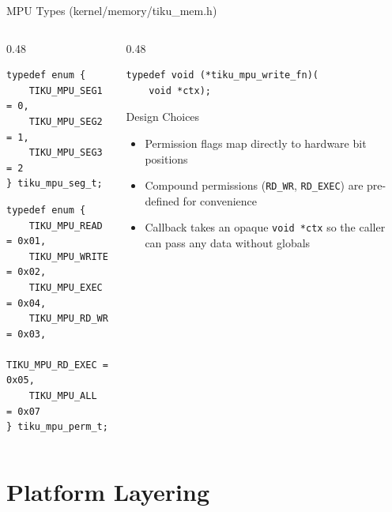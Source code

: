 \documentclass[aspectratio=169, 10pt]{beamer}
\begin{document}
\begin{frame}[fragile]{MPU Types (kernel/memory/tiku\_mem.h)}
\begin{columns}[T]
\begin{column}{0.48\textwidth}
\begin{lstlisting}[style=cstyle, title={Segment identifiers}]
typedef enum {
    TIKU_MPU_SEG1 = 0,
    TIKU_MPU_SEG2 = 1,
    TIKU_MPU_SEG3 = 2
} tiku_mpu_seg_t;
\end{lstlisting}

\begin{lstlisting}[style=cstyle, title={Permission flags}]
typedef enum {
    TIKU_MPU_READ    = 0x01,
    TIKU_MPU_WRITE   = 0x02,
    TIKU_MPU_EXEC    = 0x04,
    TIKU_MPU_RD_WR   = 0x03,
    TIKU_MPU_RD_EXEC = 0x05,
    TIKU_MPU_ALL     = 0x07
} tiku_mpu_perm_t;
\end{lstlisting}
\end{column}

\begin{column}{0.48\textwidth}
\begin{lstlisting}[style=cstyle, title={Scoped write callback}]
typedef void (*tiku_mpu_write_fn)(
    void *ctx);
\end{lstlisting}

\vspace{0.5em}
\begin{block}{Design Choices}
\begin{itemize}
  \item Permission flags map directly to hardware bit positions
  \item Compound permissions (\texttt{RD\_WR}, \texttt{RD\_EXEC}) are
        pre-defined for convenience
  \item Callback takes an opaque \texttt{void *ctx} so the caller
        can pass any data without globals
\end{itemize}
\end{block}
\end{column}
\end{columns}
\end{frame}

\section{Platform Layering}
\end{document}
